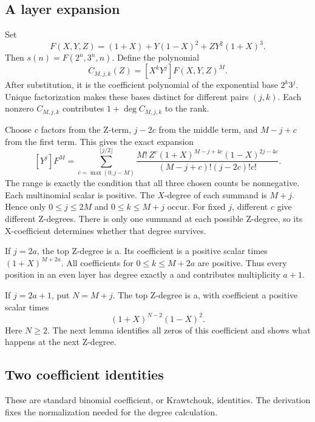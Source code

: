 \documentclass[11pt,a4paper]{article}
\begin{document}
\subsection{A layer expansion}
Set
\[
 F(X,Y,Z)=(1+X)+Y(1-X)^2+ZY^2(1+X)^3.
\]
Then $s(n)=F(2^n,3^n,n)$. Define the polynomial
\[
 C_{M,j,k}(Z)=[X^kY^j]F(X,Y,Z)^M.
\]
After substitution, it is the coefficient polynomial of the exponential
base $2^k3^j$. Unique factorization makes these bases distinct for different
pairs $(j,k)$. Each nonzero $C_{M,j,k}$ contributes
$1+\deg C_{M,j,k}$ to the rank.

Choose $c$ factors from the Z-term, $j-2c$ from the middle term, and $M-j+c$
from the first term. This gives the exact expansion
\begin{equation}\label{eq:layers}
 [Y^j]F^M=
 \sum_{c=\max(0,j-M)}^{\lfloor j/2\rfloor}
 \frac{M!\,Z^c(1+X)^{M-j+4c}(1-X)^{2j-4c}}
 {(M-j+c)!(j-2c)!c!}.
\end{equation}
The range is exactly the condition that all three chosen counts be
nonnegative. Each multinomial scalar is positive. The $X$-degree of each
summand is $M+j$. Hence only $0\le j\le2M$ and $0\le k\le M+j$ occur.
For fixed $j$, different $c$ give different Z-degrees. There is only one
summand at each possible Z-degree, so its X-coefficient determines whether
that degree survives.

If $j=2a$, the top Z-degree is a. Its coefficient is a positive scalar
times $(1+X)^{M+2a}$. All coefficients for $0\le k\le M+2a$ are positive.
Thus every position in an even layer has degree exactly a and contributes
multiplicity $a+1$.

If $j=2a+1$, put $N=M+j$. The top Z-degree is a, with coefficient a
positive scalar times
\begin{equation}\label{eq:top}
 (1+X)^{N-2}(1-X)^2.
\end{equation}
Here $N\ge2$. The next lemma identifies all zeros of this coefficient and
shows what happens at the next Z-degree.

\subsection{Two coefficient identities}
These are standard binomial coefficient, or Krawtchouk, identities.
The derivation fixes the normalization needed for the degree calculation.
\end{document}

